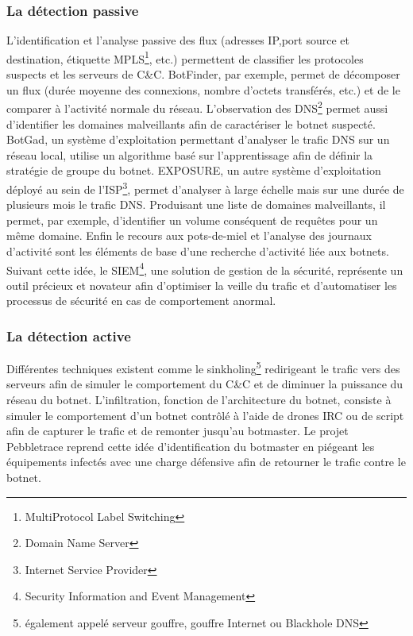 \subsubsection{La détection passive}
L'identification et l'analyse passive des flux (adresses IP,port source et destination, étiquette MPLS\footnote{MultiProtocol Label Switching}, etc.) permettent de classifier les protocoles suspects et les serveurs de C\&C.
\newline BotFinder, par exemple, permet de décomposer un flux (durée moyenne des connexions, nombre d'octets transférés, etc.) et de le comparer à l'activité normale du réseau.
\newline L'observation des DNS\footnote{Domain Name Server} permet aussi d'identifier les domaines malveillants afin de caractériser le botnet suspecté.
BotGad, un système d'exploitation permettant d'analyser le trafic DNS sur un réseau local, utilise un algorithme basé sur l'apprentissage afin de définir la stratégie de groupe du botnet.
\newline EXPOSURE, un autre système d'exploitation déployé au sein de l'ISP\footnote{Internet Service Provider}, permet d'analyser à large échelle mais sur une durée de plusieurs mois le trafic DNS. Produisant une liste de domaines malveillants, il permet, par exemple, d'identifier un volume conséquent de requêtes pour un même domaine.
\newline Enfin le recours aux pots-de-miel et l'analyse des journaux d'activité sont les éléments de base d'une recherche d'activité liée aux botnets.
Suivant cette idée, le SIEM\footnote{Security Information and Event Management}, une solution de gestion de la sécurité, représente un outil précieux et novateur afin d'optimiser la veille du trafic et d'automatiser les processus de sécurité en cas de comportement anormal.

\subsubsection{La détection active}
Différentes techniques existent comme le sinkholing\footnote{également appelé serveur gouffre, gouffre Internet ou Blackhole DNS } redirigeant le trafic vers des serveurs afin de simuler le comportement du C\&C et de diminuer la puissance du réseau du botnet.
\newline L'infiltration, fonction de l'architecture du botnet, consiste à simuler le comportement d'un botnet contrôlé à l'aide de drones IRC ou de script afin de capturer le trafic et de remonter jusqu'au botmaster.
Le projet Pebbletrace reprend cette idée d’identification du botmaster en piégeant les équipements infectés avec une charge défensive afin de retourner le trafic contre le botnet.


